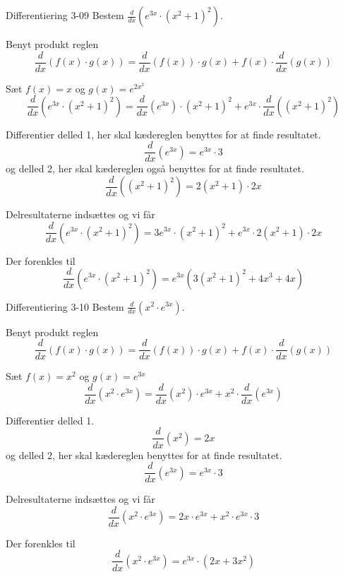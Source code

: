\documentclass{article}
\begin{document}
\begin{exercise}{Differentiering 3-09}
Bestem $\frac{d}{dx} \left(e^{3x} \cdot (x^2 + 1)^2 \right)$.


\hint
Benyt produkt reglen
\[
\frac{d}{dx} \left( f(x) \cdot g(x) \right) = \frac{d}{dx} \left( f(x) \right) \cdot g(x) + f(x) \cdot \frac{d}{dx} \left( g(x) \right)
\]

\hint
Sæt $f(x) = x$ og $g(x) = e^{2x^2}$
\[
\frac{d}{dx} \left( e^{3x} \cdot (x^2 + 1)^2 \right) = \frac{d}{dx} \left( e^{3x} \right) \cdot (x^2 + 1)^2 + e^{3x} \cdot \frac{d}{dx} \left( (x^2 + 1)^2 \right)
\]

\hint
Differentier delled 1, her skal kædereglen benyttes for at finde resultatet.
\[
\frac{d}{dx} \left( e^{3x} \right) = e^{3x} \cdot 3
\]
og delled 2, her skal kædereglen også benyttes for at finde resultatet.
\[
\frac{d}{dx} \left( (x^2 + 1)^2 \right) = 2 (x^2 + 1) \cdot 2x
\]


\hint
Delresultaterne indsættes og vi får
\[
\frac{d}{dx} \left( e^{3x} \cdot (x^2 + 1)^2 \right) = 3e^{3x} \cdot (x^2 + 1)^2 + e^{3x} \cdot 2 (x^2 + 1) \cdot 2x
\]

\hint
Der forenkles til
\[
\frac{d}{dx} \left( e^{3x} \cdot (x^2 + 1)^2 \right) = e^{3x} \left( 3 (x^2 +1)^2 + 4x^3 + 4x \right)
\]

\end{exercise}


\begin{exercise}{Differentiering 3-10}
Bestem $\frac{d}{dx} \left( x^2 \cdot e^{3x} \right)$.


\hint
Benyt produkt reglen
\[
\frac{d}{dx} \left( f(x) \cdot g(x) \right) = \frac{d}{dx} \left( f(x) \right) \cdot g(x) + f(x) \cdot \frac{d}{dx} \left( g(x) \right)
\]

\hint
Sæt $f(x) = x^2$ og $g(x) = e^{3x}$
\[
\frac{d}{dx} \left( x^2\cdot e^{3x} \right) = \frac{d}{dx} \left( x^2 \right) \cdot e^{3x} + x^2 \cdot \frac{d}{dx} \left( e^{3x} \right)
\]

\hint
Differentier delled 1.
\[
\frac{d}{dx} \left( x^2 \right) = 2x
\]
og delled 2, her skal kædereglen benyttes for at finde resultatet.
\[
\frac{d}{dx} \left( e^{3x} \right) = e^{3x} \cdot 3
\]


\hint
Delresultaterne indsættes og vi får
\[
\frac{d}{dx} \left( x^2 \cdot e^{3x} \right) = 2x \cdot e^{3x} + x^2 \cdot e^{3x} \cdot 3
\]

\hint
Der forenkles til
\[
\frac{d}{dx} \left( x^2 \cdot e^{3x} \right) = e^{3x} \cdot (2x + 3x^2)
\]

\end{exercise}
\end{document}
